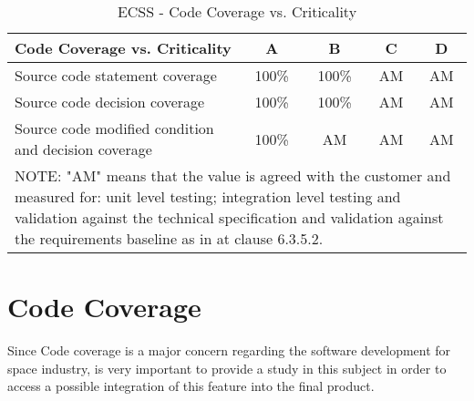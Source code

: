 {\begin{table}[!ht]
\centering
\noindent \begin{tabular}{|m{6cm}|c|c|c|c|}
\hline
\textbf{Code Coverage vs. Criticality} & A & B & C & D \\\hline
Source code statement coverage & 100\% & 100\% & AM & AM \\\hline
Source code decision coverage & 100\% & 100\% & AM & AM \\\hline
Source code modified condition and decision coverage & 100\% & AM & AM & AM \\\hline
\multicolumn{5}{|m{14cm}|}{
NOTE: "AM" means that the value is agreed with the customer and measured for:
unit level testing; integration level testing and validation against the
technical specification and validation against the requirements baseline
as in \cite{ecss-q-st-80c} at clause 6.3.5.2.
}\\\hline
\end{tabular}
\caption{\protect\ac{ECSS} - Code Coverage vs. Criticality}\label{tab:ccoverage}
\end{table}

\section{Code Coverage}\label{sec:ccoverage}
Since Code coverage is a major concern regarding the software development for space industry, is very important to provide a study in this subject
in order to access a possible integration of this feature into the final product.
}
\\
